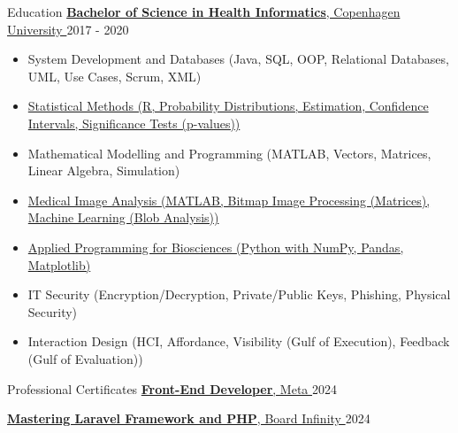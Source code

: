\documentclass{resume}
\begin{document}
\begin{rSection}{Education}
    \href{https://healthsciences.ku.dk}{
        \textbf{Bachelor of Science in Health Informatics}, Copenhagen University
    }
    \hfill
    2017 - 2020
    \begin{itemize}
        \item System Development and Databases (Java, SQL, OOP, Relational Databases, UML, Use Cases, Scrum, XML)
        \item \href{https://kurser.ku.dk/course/sitb17003u/2017-2018}{Statistical Methods (R, Probability Distributions, Estimation, Confidence Intervals, Significance Tests (p-values))}
        \item Mathematical Modelling and Programming (MATLAB, Vectors, Matrices, Linear Algebra, Simulation)
        \item \href{https://kurser.dtu.dk/course/22525}{Medical Image Analysis (MATLAB, Bitmap Image Processing (Matrices), Machine Learning (Blob Analysis))}
        \item \href{https://kurser.ku.dk/course/sbia10210u/2020-2021}{Applied Programming for Biosciences (Python with NumPy, Pandas, Matplotlib)}
        \item IT Security (Encryption/Decryption, Private/Public Keys, Phishing, Physical Security)
        \item Interaction Design (HCI, Affordance, Visibility (Gulf of Execution), Feedback (Gulf of Evaluation))
    \end{itemize}
\end{rSection}


\begin{rSection}{Professional Certificates}
    \href{https://www.coursera.org/professional-certificates/meta-front-end-developer}{
        \textbf{Front-End Developer}, Meta
    }
    \hfill
    2024

    \href{https://www.coursera.org/learn/laravel-framework-and-php}{
        \textbf{Mastering Laravel Framework and PHP}, Board Infinity
    }
    \hfill
    2024
\end{rSection}
\end{document}
